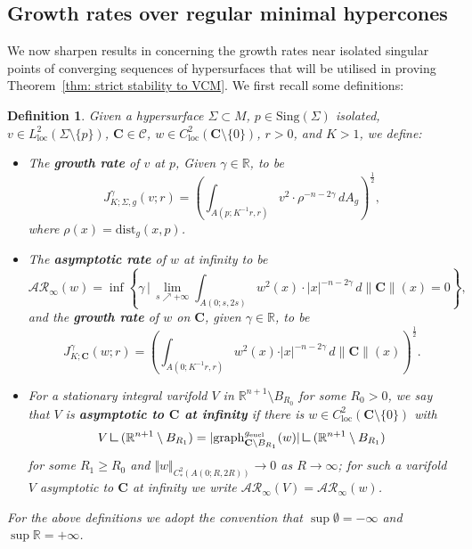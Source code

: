 \documentclass[12pt]{article}
\newtheorem{definition}{Definition}
\newcommand{\mres}{\mathbin{\vrule height 1.6ex depth 0pt width
0.13ex\vrule height 0.13ex depth 0pt width 1.3ex}}
\begin{document}
\subsection{Growth rates over regular minimal hypercones}

We now sharpen results in \cite[Appendix A]{MNP25} concerning the growth rates near isolated singular points of converging sequences of hypersurfaces that will be utilised in proving Theorem~\ref{thm: strict stability to VCM}. We first recall some definitions:

\begin{definition} \label{definition: asymptotic and growth rates} Given a hypersurface $\Sigma \subset M$, $p\in \mathrm{Sing}(\Sigma)$ isolated, $v\in L^2_{\mathrm{loc}}(\Sigma \setminus \{p\})$, $\mathbf{C} \in \mathscr{C}$, $w \in C^2_{\mathrm{loc}}(\mathbf{C} \setminus \{0\})$, $r > 0$, and $K > 1$, we define:

\begin{itemize}
    \item The \textbf{growth rate} of $v$ at $p$, Given $\gamma \in \mathbb{R}$, to be
        $$ J_{K;\Sigma,g}^{\gamma}(v;r) = \left(\int_{A(p;K^{-1}r, r)} v^2 \cdot \rho^{- n - 2\gamma} \, dA_g\right)^{\frac{1}{2}},$$
    where $\rho(x) = \mathrm{dist}_g(x, p)$. 

    \item The \textbf{asymptotic rate} of $w$ at infinity to be
        $$\mathcal{AR}_\infty(w) = \inf\left\{ \gamma \, \bigg| \, \lim_{s\nearrow +\infty} \int_{A(0;s,2s)} w^2(x) \cdot |x|^{-n-2\gamma} \, d\|\mathbf{C}\|(x) = 0 \right\},$$ 
    and the \textbf{growth rate} of $w$ on $\mathbf{C}$, given $\gamma \in \mathbb{R}$, to be
    \begin{equation*}
        J_{K;\mathbf{C}}^{\gamma}(w;r) = \left(\int_{A(0;K^{-1}r, r)} w^2(x) \cdot \vert x \vert^{- n - 2\gamma} \, d\|\mathbf{C}\|(x)\right)^\frac{1}{2}.
    \end{equation*}

    \item For a stationary integral varifold $V$ in $\mathbb{R}^{n+1} \setminus B_{R_0}$ for some $R_0 > 0$, we say that $V$ is \textbf{asymptotic to $\mathbf{C}$ at infinity} if there is $w \in C^2_\mathrm{loc}(\mathbf{C} \setminus \{0\})$ with
    $$V \mres (\mathbb{R}^{n+1} \setminus B_{R_1}) = |\mathrm{graph}^{g_\mathrm{eucl}}_{\mathbf{C} \setminus B_{R_1}}(w)|\mres (\mathbb{R}^{n+1} \setminus B_{R_1}) $$ for some $R_1 \geq R_0$ and $\Vert w\Vert_{C^2_*(A(0;R,2R))} \rightarrow 0$ as $R \rightarrow \infty$; for such a varifold $V$ asymptotic to $\mathbf{C}$ at infinity we write $\mathcal{AR}_\infty(V) = \mathcal{AR}_\infty(w)$. 
\end{itemize}
For the above definitions we adopt the convention that $\sup \emptyset = -\infty$ and $\sup \mathbb{R} = +\infty$.
\end{definition}
\end{document}
